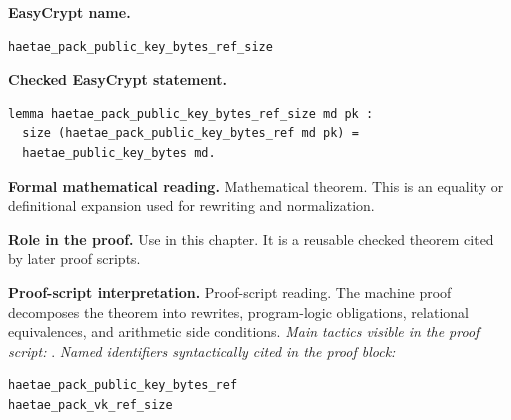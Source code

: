 \begin{formaltheorem}
\noindent\textbf{EasyCrypt name.}
\begin{lstlisting}[language=EasyCrypt,basicstyle=\ttfamily\scriptsize]
haetae_pack_public_key_bytes_ref_size
\end{lstlisting}
\noindent\textbf{Checked EasyCrypt statement.}
\begin{lstlisting}[language=EasyCrypt,basicstyle=\ttfamily\scriptsize]
lemma haetae_pack_public_key_bytes_ref_size md pk :
  size (haetae_pack_public_key_bytes_ref md pk) =
  haetae_public_key_bytes md.
\end{lstlisting}
\noindent\textbf{Formal mathematical reading.}
Mathematical theorem. This is an equality or definitional expansion used for rewriting and normalization.

\noindent\textbf{Role in the proof.}
Use in this chapter. It is a reusable checked theorem cited by later proof scripts.

\noindent\textbf{Proof-script interpretation.}
Proof-script reading. The machine proof decomposes the theorem into rewrites, program-logic obligations, relational equivalences, and arithmetic side conditions.
\emph{Main tactics visible in the proof script:} .
\emph{Named identifiers syntactically cited in the proof block:}
\begin{lstlisting}[language=EasyCrypt,basicstyle=\ttfamily\scriptsize]
haetae_pack_public_key_bytes_ref
haetae_pack_vk_ref_size
\end{lstlisting}

\end{formaltheorem}

